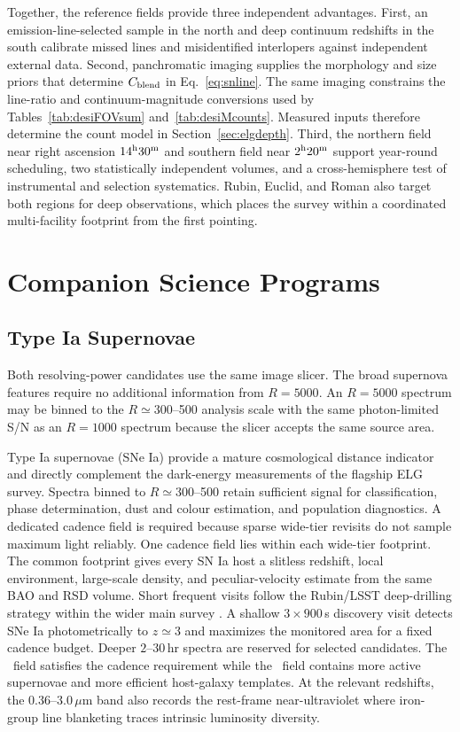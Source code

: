Together, the reference fields provide three independent advantages. First, an emission-line-selected sample in the north and deep continuum redshifts in the south calibrate missed lines and misidentified interlopers against independent external data. Second, panchromatic imaging supplies the morphology and size priors that determine $C_{\rm blend}$ in Eq.~\eqref{eq:snline}. The same imaging constrains the line-ratio and continuum-magnitude conversions used by Tables~\ref{tab:desiFOVsum} and~\ref{tab:desiMcounts}. Measured inputs therefore determine the count model in Section~\ref{sec:elgdepth}. Third, the northern field near right ascension $14^{\rm h}30^{\rm m}$ and southern field near $2^{\rm h}20^{\rm m}$ support year-round scheduling, two statistically independent volumes, and a cross-hemisphere test of instrumental and selection systematics. Rubin, Euclid, and Roman also target both regions for deep observations, which places the survey within a coordinated multi-facility footprint from the first pointing.

\clearpage
\section{Companion Science Programs}

\subsection{Type Ia Supernovae}\label{sec:snia}

Both resolving-power candidates use the same image slicer. The broad supernova features require no additional information from $R=5000$. An $R=5000$ spectrum may be binned to the $R\simeq300$--500 analysis scale with the same photon-limited S/N as an $R=1000$ spectrum because the slicer accepts the same source area.

Type Ia supernovae (SNe Ia) provide a mature cosmological distance indicator and directly complement the dark-energy measurements of the flagship ELG survey. Spectra binned to $R\simeq300$--500 retain sufficient signal for classification, phase determination, dust and colour estimation, and population diagnostics. A dedicated cadence field is required because sparse wide-tier revisits do not sample maximum light reliably. One cadence field lies within each wide-tier footprint. The common footprint gives every SN Ia host a slitless redshift, local environment, large-scale density, and peculiar-velocity estimate from the same BAO and RSD volume. Short frequent visits follow the Rubin/LSST deep-drilling strategy within the wider main survey \cite{ivezic2019lsst}. A shallow $3\times900$\,s discovery visit detects SNe Ia photometrically to $z\simeq3$ and maximizes the monitored area for a fixed cadence budget. Deeper $2$--$30$\,hr spectra are reserved for selected candidates. The \fovsmall\ field satisfies the cadence requirement while the \fovlarge\ field contains more active supernovae and more efficient host-galaxy templates. At the relevant redshifts, the $0.36$--$3.0\,\mu$m band also records the rest-frame near-ultraviolet where iron-group line blanketing traces intrinsic luminosity diversity.

